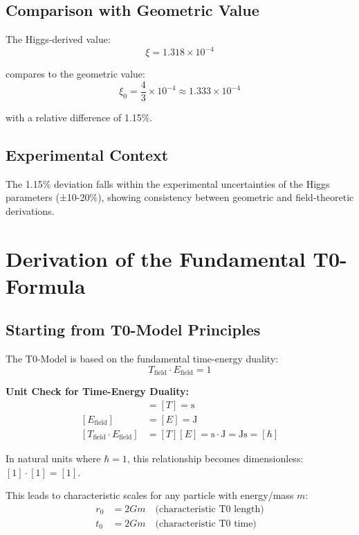 \documentclass[12pt,a4paper]{article}
\theoremstyle{definition}
\begin{document}
\subsection{Comparison with Geometric Value}
The Higgs-derived value:
\begin{equation}
	\xi = 1.318 \times 10^{-4}
\end{equation}

compares to the geometric value:
\begin{equation}
	\xi_0 = \frac{4}{3} \times 10^{-4} \approx 1.333 \times 10^{-4}
\end{equation}

with a relative difference of 1.15\%.

\subsection{Experimental Context}
The 1.15\% deviation falls within the experimental uncertainties of the Higgs parameters (±10-20\%), showing consistency between geometric and field-theoretic derivations.
	\section{Derivation of the Fundamental T0-Formula}
	
	\subsection{Starting from T0-Model Principles}
	
	The T0-Model is based on the fundamental time-energy duality:
	\begin{equation}
		T_{\text{field}} \cdot E_{\text{field}} = 1
	\end{equation}
	
	 
		\textbf{Unit Check for Time-Energy Duality:}
		\begin{align}
			[T_{\text{field}}] &= [T] = \si{\second} \\
			[E_{\text{field}}] &= [E] = \si{\joule} \\
			[T_{\text{field}} \cdot E_{\text{field}}] &= [T][E] = \si{\second} \cdot \si{\joule} = \si{\joule\second} = [\hbar]
		\end{align}
		
		In natural units where $\hbar = 1$, this relationship becomes dimensionless: $[1] \cdot [1] = [1]$.
	 
	
	This leads to characteristic scales for any particle with energy/mass $m$:
	\begin{align}
		r_0 &= 2Gm \quad \text{(characteristic T0 length)} \\
		t_0 &= 2Gm \quad \text{(characteristic T0 time)}
	\end{align}
	
\end{document}
